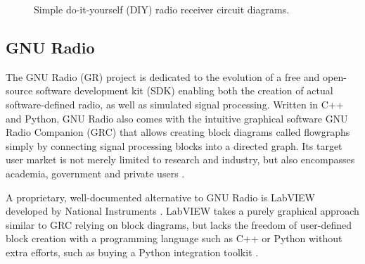 \begin{figure}[tb]
	\label{fig:radio-receiver-circuits}
	\begin{center}
		\qquad
	\end{center}
	\caption{Simple do-it-yourself (DIY) radio receiver circuit diagrams.}
\end{figure}

\subsection{GNU Radio}
\label{sec:gnu-radio}

The GNU Radio (GR) project is dedicated to the evolution of a free and open-source software development kit (SDK) enabling both the creation of actual software-defined radio, as well as simulated signal processing. Written in C++ and Python, GNU Radio also comes with the intuitive graphical software GNU Radio Companion (GRC) that allows creating block diagrams called flowgraphs simply by connecting signal processing blocks into a directed graph. Its target user market is not merely limited to research and industry, but also encompasses academia, government and private users \cite{gnuradio-about}.

A proprietary, well-documented alternative to GNU Radio is LabVIEW developed by National Instruments \cite{labview-about}. LabVIEW takes a purely graphical approach similar to GRC relying on block diagrams, but lacks the freedom of user-defined block creation with a programming language such as C++ or Python without extra efforts, such as buying a Python integration toolkit \cite{labview-python}.

